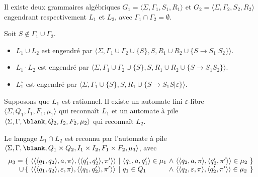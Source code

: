 \begin{corrections}
  
  Il existe deux grammaires algébriques $G_1 = \langle \Sigma, \Gamma_1, S_1, R_1\rangle$ et $G_2 = \langle \Sigma, \Gamma_2, S_2, R_2\rangle$ engendrant
  respectivement $L_1$ et $L_2$, avec $\Gamma_1 \cap \Gamma_2 = \emptyset$. 
  \begin{questions}
  \item Soit $S \notin \Gamma_1 \cup \Gamma_2$. 
    \begin{itemize}
    \item $L_1 \cup L_2$ est engendré par $\langle \Sigma, \Gamma_1 \cup \Gamma_2 \cup \{S\}, S, R_1 \cup R_2 \cup \{S \rightarrow S_1 | S_2\} \rangle$.
    \item $L_1 \cdot L_2$ est engendré par $\langle \Sigma, \Gamma_1 \cup \Gamma_2 \cup \{S\}, S, R_1 \cup R_2 \cup \{S \rightarrow S_1 S_2\} \rangle$.
    \item $L_1 ^\star$ est engendré par $\langle \Sigma, \Gamma_1 \cup \{S\}, S, R_1 \cup \{S \rightarrow S_1 S | \varepsilon\} \rangle$.
    \end{itemize}

  \item Supposons que $L_1$ est rationnel. Il existe un automate fini $\varepsilon$-libre $\langle \Sigma, Q_1, I_1, F_1, \mu_1 \rangle$
    qui reconnaît $L_1$ et un automate à pile $\langle \Sigma, \Gamma, \blank, Q_2, I_2, F_2, \mu_2 \rangle$ qui reconnaît $L_2$. 
 
    Le langage $L_1 \cap L_2$ est reconnu par l'automate à pile
    $\langle \Sigma, \Gamma, \blank, Q_1 \times Q_2, I_1 \times I_2, F_1 \times F_2, \mu_3 \rangle$,
    avec
    $$\begin{array}{@{~}r@{~}l@{~}c@{~}l@{~}c@{~}l@{~}l@{~}}
      \mu_3 = \{&
      \langle \langle \langle q_1, q_2\rangle, a, \pi \rangle, \langle \langle q'_1, q'_2\rangle, \pi' \rangle \rangle  &\mid&
      \langle q_1, a, q'_1 \rangle \in \mu_1                                                                            &\land&
      \langle \langle q_2, a, \pi \rangle, \langle q'_2, \pi' \rangle \rangle \in \mu_2                                 &\}\\
      \cup\, \{&
      \langle \langle \langle q_1, q_2\rangle, \varepsilon, \pi \rangle, \langle \langle q_1, q'_2\rangle, \pi' \rangle \rangle  &\mid&
      q_1 \in Q_1                                                                                                               &\land&
      \langle \langle q_2, \varepsilon, \pi \rangle, \langle q'_2, \pi' \rangle \rangle \in \mu_2                                &\}\\
    \end{array}
    $$
    

\end{questions}
\end{corrections}
